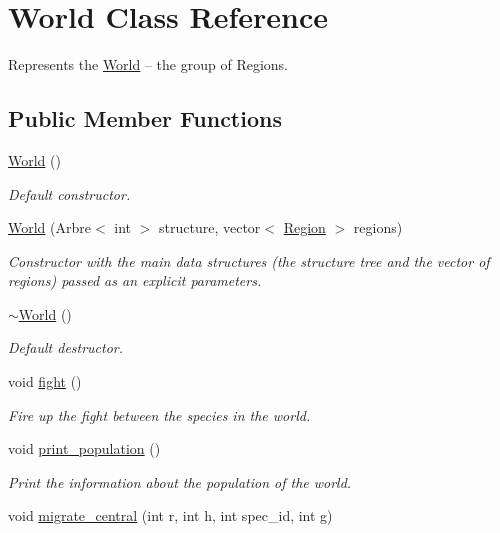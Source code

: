 \hypertarget{class_world}{\section{World Class Reference}
\label{class_world}
}


Represents the \hyperlink{class_world}{World} – the group of Regions.  


\subsection*{Public Member Functions}
\begin{DoxyCompactItemize}
\item 
\hyperlink{class_world_afa39d4e6f714a7a3691ac0c656f5e8a8}{World} ()
\begin{DoxyCompactList}\small\item\em Default constructor. \end{DoxyCompactList}\item 
\hyperlink{class_world_afd90f5be9f4c530419d66fd656f9de8d}{World} (Arbre$<$ int $>$ structure, vector$<$ \hyperlink{class_region}{Region} $>$ regions)
\begin{DoxyCompactList}\small\item\em Constructor with the main data structures (the structure tree and the vector of regions) passed as an explicit parameters. \end{DoxyCompactList}\item 
\hyperlink{class_world_a8c73fba541a5817fff65147ba47cd827}{$\sim$\-World} ()
\begin{DoxyCompactList}\small\item\em Default destructor. \end{DoxyCompactList}\item 
void \hyperlink{class_world_a60f792899e98b54682755748f2576700}{fight} ()
\begin{DoxyCompactList}\small\item\em Fire up the fight between the species in the world. \end{DoxyCompactList}\item 
void \hyperlink{class_world_a97f4a9b980d4e11790568b05909eb8a2}{print\-\_\-population} ()
\begin{DoxyCompactList}\small\item\em Print the information about the population of the world. \end{DoxyCompactList}\item 
void \hyperlink{class_world_ad94ae4dc6a06819bca7ce2e0966ce5ab}{migrate\-\_\-central} (int r, int h, int spec\-\_\-id, int g)

\end{DoxyCompactItemize}
